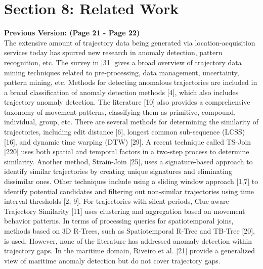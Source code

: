 \documentclass[twoside,leqno,onecolumn]{article}
\begin{document}
\section{Section 8: Related Work}
\label{section:Related_work}
\textbf{Previous Version: (Page 21 - Page 22)\\} The extensive amount of trajectory data being generated via location-acquisition services today has spurred new research in anomaly detection, pattern recognition, etc. The survey in [31] gives a broad overview of trajectory data mining techniques related to pre-processing, data management, uncertainty, pattern mining, etc. Methods for detecting anomalous trajectories are included in a broad classification of anomaly detection methods [4], which also includes trajectory anomaly detection. The literature [10] also provides a comprehensive taxonomy of movement patterns, classifying them as primitive, compound, individual, group, etc. There are several methods for determining the similarity of trajectories, including edit distance [6], longest common sub-sequence (LCSS) [16], and dynamic time warping (DTW) [29]. A recent technique called TS-Join [220] uses both spatial and temporal factors in a two-step process to determine similarity. Another method, Strain-Join [25], uses a signature-based approach to identify similar trajectories by creating unique signatures and eliminating dissimilar ones. Other techniques include using a sliding window approach [1,7] to identify potential candidates and filtering out non-similar trajectories using time interval thresholds [2, 9]. For trajectories with silent periods, Clue-aware Trajectory Similarity [11] uses clustering and aggregation based on movement behavior patterns. In terms of processing queries for spatiotemporal joins, methods based on 3D R-Trees, such as Spatiotemporal R-Tree and TB-Tree [20], is used. However, none of the literature has addressed anomaly detection within trajectory gaps. In the maritime domain, Riveiro et al. [21] provide a generalized view of maritime anomaly detection but do not cover trajectory gaps.
\end{document}
